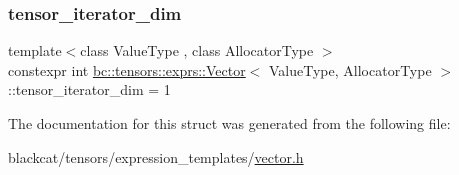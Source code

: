 \subsubsection{\texorpdfstring{tensor\+\_\+iterator\+\_\+dim}{tensor\_iterator\_dim}}
{\footnotesize\ttfamily template$<$class Value\+Type , class Allocator\+Type $>$ \\
constexpr int \hyperlink{structbc_1_1tensors_1_1exprs_1_1Vector}{bc\+::tensors\+::exprs\+::\+Vector}$<$ Value\+Type, Allocator\+Type $>$\+::tensor\+\_\+iterator\+\_\+dim = 1\hspace{0.3cm}{\ttfamily [static]}}



The documentation for this struct was generated from the following file\+:\begin{DoxyCompactItemize}
\item 
blackcat/tensors/expression\+\_\+templates/\hyperlink{vector_8h}{vector.\+h}\end{DoxyCompactItemize}
